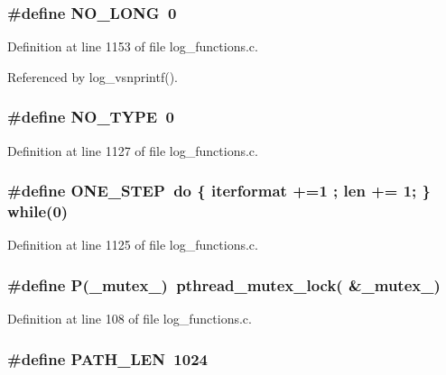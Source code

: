 \subsubsection{\setlength{\rightskip}{0pt plus 5cm}\#define NO\_\-LONG\ 0}\label{log__functions_8c_a30}




Definition at line 1153 of file log\_\-functions.c.

Referenced by log\_\-vsnprintf().
\subsubsection{\setlength{\rightskip}{0pt plus 5cm}\#define NO\_\-TYPE\ 0}\label{log__functions_8c_a9}




Definition at line 1127 of file log\_\-functions.c.
\subsubsection{\setlength{\rightskip}{0pt plus 5cm}\#define ONE\_\-STEP\ do \{ iterformat +=1 ; len += 1; \} while(0)}\label{log__functions_8c_a8}




Definition at line 1125 of file log\_\-functions.c.
\subsubsection{\setlength{\rightskip}{0pt plus 5cm}\#define P(\_\-mutex\_\-)\ pthread\_\-mutex\_\-lock( \&\_\-mutex\_\-)}\label{log__functions_8c_a5}




Definition at line 108 of file log\_\-functions.c.
\subsubsection{\setlength{\rightskip}{0pt plus 5cm}\#define PATH\_\-LEN\ 1024}\label{log__functions_8c_a1}




